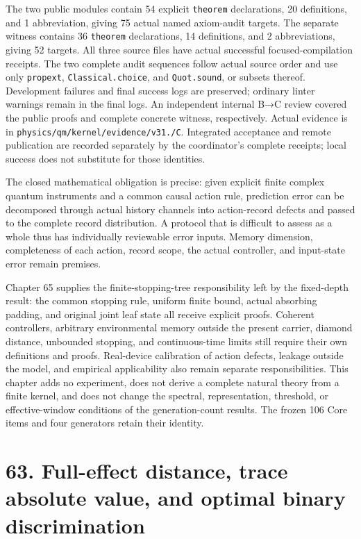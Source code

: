 \documentclass[
  11pt,
  oneside]{book}
\begin{document}
The two public modules contain 54 explicit \texttt{theorem}
declarations, 20 definitions, and 1 abbreviation, giving 75 actual named
axiom-audit targets. The separate witness contains 36 \texttt{theorem}
declarations, 14 definitions, and 2 abbreviations, giving 52 targets.
All three source files have actual successful focused-compilation
receipts. The two complete audit sequences follow actual source order
and use only \texttt{propext}, \texttt{Classical.\allowbreak choice}, and
\texttt{Quot.\allowbreak sound}, or subsets thereof. Development failures and final
success logs are preserved; ordinary linter warnings remain in the final
logs. An independent internal B→C review covered the public proofs and
complete concrete witness, respectively. Actual evidence is in
\texttt{physics/\allowbreak qm/\allowbreak kernel/\allowbreak evidence/\allowbreak v31./\allowbreak C}. Integrated acceptance and
remote publication are recorded separately by the coordinator's complete
receipts; local success does not substitute for those identities.

The closed mathematical obligation is precise: given explicit finite
complex quantum instruments and a common causal action rule, prediction
error can be decomposed through actual history channels into
action-record defects and passed to the complete record distribution. A
protocol that is difficult to assess as a whole thus has individually
reviewable error inputs. Memory dimension, completeness of each action,
record scope, the actual controller, and input-state error remain
premises.

Chapter 65 supplies the finite-stopping-tree responsibility left by the
fixed-depth result: the common stopping rule, uniform finite bound,
actual absorbing padding, and original joint leaf state all receive
explicit proofs. Coherent controllers, arbitrary environmental memory
outside the present carrier, diamond distance, unbounded stopping, and
continuous-time limits still require their own definitions and proofs.
Real-device calibration of action defects, leakage outside the model,
and empirical applicability also remain separate responsibilities. This
chapter adds no experiment, does not derive a complete natural theory
from a finite kernel, and does not change the spectral, representation,
threshold, or effective-window conditions of the generation-count
results. The frozen 106 Core items and four generators retain their
identity.

\chapter{63. Full-effect distance, trace absolute value, and optimal
binary discrimination}\label{ch-63}
\end{document}
